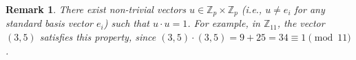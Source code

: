 \documentclass[11pt]{article}
\newtheorem{rem}[theorem]{Remark}
\begin{document}
    
%    
%    

\begin{rem}
    There exist non-trivial vectors $u \in \mathbb{Z}_p \times \mathbb{Z}_p$ (i.e., $u \neq e_i$ for any standard basis vector $e_i$) such that $u \cdot u = 1$. For example, in $\mathbb{Z}_{11}$, the vector $(3, 5)$ satisfies this property, since $(3, 5) \cdot (3, 5) = 9 + 25 = 34 \equiv 1 \pmod{11}$.
\end{rem}
\end{document}
